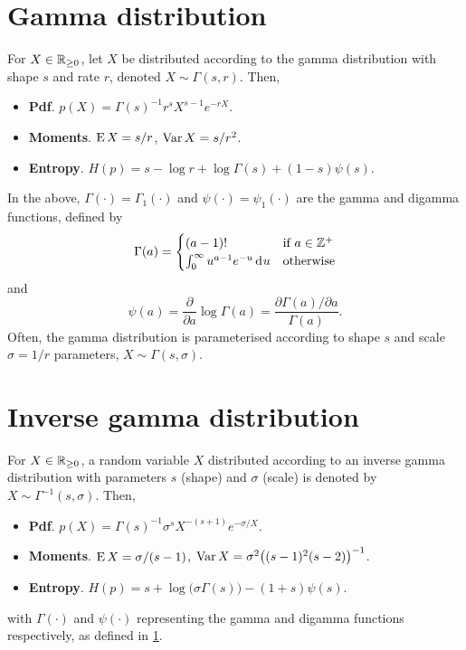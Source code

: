 \section{Gamma distribution}
\label{apx:gammadist}
\vspace{-0.2em}

\begin{definition}
  For $X\in\mathbb{R}_{\geq 0}$, let $X$ be distributed according to the gamma distribution with shape $s$ and rate $r$, denoted $X\sim\Gamma(s,r)$. 
  Then,
  \begin{itemize}
    \item \textbf{Pdf}. $p(X) = \Gamma(s)^{-1} r^s X^{s-1} e^{-rX}$.
    \item \textbf{Moments}. $\operatorname{E} X=s/r$, $\operatorname{Var} X = s/r^2$.
    \item \textbf{Entropy}. $H(p)=s - \log r + \log \Gamma(s) + (1-s)\psi(s)$.
  \end{itemize}
\end{definition}

In the above, $\Gamma(\cdot) = \Gamma_1(\cdot)$ and $\psi(\cdot) = \psi_1(\cdot)$ are the gamma and digamma functions, defined by
\[
  \Gamma(a) = 
  \begin{cases}
    (a-1)! &\text{if } a \in \mathbb{Z}^+ \\
    \int_0^\infty u^{a-1} e^{-u} \operatorname{d}\hspace{0.5pt}\! u &\text{otherwise} \\
  \end{cases}
\]
and
\[
  \psi(a) = \frac{\partial}{\partial a}\log \Gamma(a) = \frac{\partial\Gamma(a)/\partial a}{\Gamma(a)}.
\]
Often, the gamma distribution is parameterised according to shape $s$ and scale $\sigma = 1/r$ parameters, $X\sim\Gamma(s,\sigma)$.
\vspace{-0.5em}

\section{Inverse gamma distribution}
\label{def:invgam}
\vspace{-0.2em}

\begin{definition}
  For $X\in\mathbb{R}_{\geq 0}$, a random variable $X$ distributed according to an inverse gamma distribution with parameters $s$ (shape) and $\sigma$ (scale) is denoted by $X\sim\Gamma^{-1}(s,\sigma)$.
  Then,
  \begin{itemize}
    \item \textbf{Pdf}. $p(X) = \Gamma(s)^{-1} \sigma^s  X^{-(s+1)} e^{-\sigma/X}$.
    \item \textbf{Moments}. $\operatorname{E} X=\sigma/(s-1)$, $\operatorname{Var} X = \sigma^2\big((s-1)^2(s-2) \big)^{-1}$.
    \item \textbf{Entropy}. $H(p)= s + \log \big(\sigma\Gamma(s)\big) - (1+s)\psi(s)$.
  \end{itemize}
  with $\Gamma(\cdot)$ and $\psi(\cdot)$ representing the gamma and digamma functions respectively, as defined in \cref{apx:gammadist}.
\end{definition}

